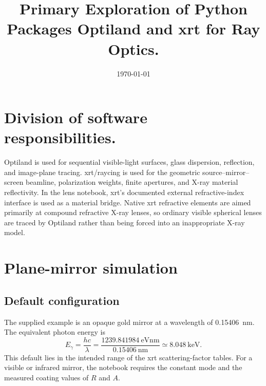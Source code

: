 \documentclass[11pt,a4paper]{article}
\title{Primary Exploration of Python Packages Optiland and xrt for Ray Optics.}
\author{}
\date{\today}
\begin{document}
\maketitle


\section{Division of software responsibilities.}
Optiland is used for sequential visible-light surfaces, glass dispersion,
reflection, and image-plane tracing.  xrt/raycing is used for the geometric
source--mirror--screen beamline, polarization weights, finite apertures, and
X-ray material reflectivity.  In the lens notebook, xrt's documented external
refractive-index interface is used as a material bridge.  Native xrt refractive
elements are aimed primarily at compound refractive X-ray lenses, so ordinary
visible spherical lenses are traced by Optiland rather than being forced into
an inappropriate X-ray model.

\section{Plane-mirror simulation}

\subsection{Default configuration}

The supplied example is an opaque gold mirror at a wavelength of
\SI{0.15406}{\nano\metre}.  The equivalent photon energy is
\begin{equation}
 E_\gamma=\frac{hc}{\lambda}
 =\frac{\SI{1239.841984}{\electronvolt\nano\metre}}
 {\SI{0.15406}{\nano\metre}}
 \simeq \SI{8.048}{\kilo\electronvolt}.
\end{equation}
This default lies in the intended range of the xrt scattering-factor tables.
For a visible or infrared mirror, the notebook requires the constant mode and
the measured coating values of $R$ and $A$.
\end{document}
